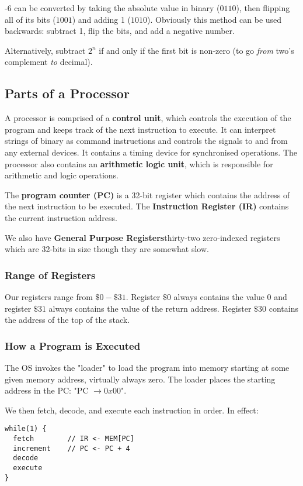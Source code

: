 \documentclass[12pt]{article}
\begin{document}
-6 can be converted by taking the absolute value in binary ($0110$), then flipping all of its bits ($1001$) and adding 1 ($1010$). Obviously this method can be used backwards: subtract 1, flip the bits, and add a negative number.

Alternatively, subtract $2^n$ if and only if the first bit is non-zero (to go {\it from} two's complement {\it to} decimal).

\subsection*{Parts of a Processor}
A processor is comprised of a {\bf control unit}, which controls the execution of the program and keeps track of the next instruction to execute. It can interpret strings of binary as command instructions and controls the signals to and from any external devices. It contains a timing device for synchronised operations. The processor also contains an {\bf arithmetic logic unit}, which is responsible for arithmetic and logic operations.

The {\bf program counter (PC)} is a 32-bit register which contains the address of the next instruction to be executed. The {\bf Instruction Register (IR)} contains the current instruction address.

We also have {\bf General Purpose Registers}{thirty-two zero-indexed registers which are 32-bits in size} though they are somewhat slow.

\subsubsection*{Range of Registers}
Our registers range from $\$0 - \$31$. Register $\$0$ always contains the value $0$ and register $\$31$ always contains the value of the return address. Register $\$30$ contains the address of the top of the stack.

\subsubsection*{How a Program is Executed}
The OS invokes the "loader" to load the program into memory starting at some given memory address, virtually always zero. The loader places the starting address in the PC: "PC $\rightarrow 0x00$".

We then fetch, decode, and execute each instruction in order. In effect:

\begin{verbatim}
while(1) {
  fetch        // IR <- MEM[PC]
  increment    // PC <- PC + 4
  decode
  execute
}
\end{verbatim}
\end{document}
